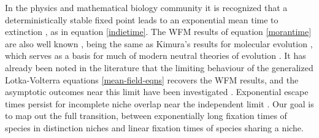 \documentclass[a4paper,10pt]{article}
\numberwithin{equation}{section} %
\begin{document}
In the physics and mathematical biology community it is recognized that a deterministically stable fixed point leads to an exponential mean time to extinction \cite{Ovaskainen2010,Assaf2016}, as in equation \ref{indietime}. 
The WFM results of equation \ref{morantime} are also well known \cite{Moran1962,Lin2012}, being the same as Kimura's results for molecular evolution \cite{Kimura1968}, which serves as a basis for much of modern neutral theories of evolution \cite{Kingman1982,Hubbell2001}. %
It has already been noted in the literature that the limiting behaviour of the generalized Lotka-Volterra equations \ref{mean-field-eqns} recovers the WFM results, and the asymptotic outcomes near this limit have been investigated \cite{Antal2006,Chotibut2015,Dobrinevski2012,Fisher2014,Constable2015,Lin2012}. 
Exponential escape times persist for incomplete niche overlap near the independent limit \cite{Gabel2013,Fisher2014}.
Our goal is to map out the full transition, between exponentially long fixation times of species in distinction niches and linear fixation times of species sharing a niche. %

\end{document}
